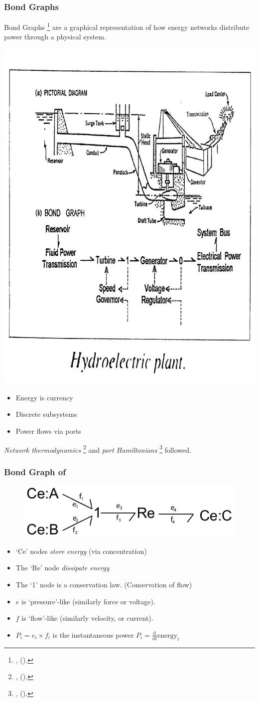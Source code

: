 \documentclass[11pt,reqno]{beamer}
\newcommand{\D}[2]{\frac{\mathrm{d} #1}{\mathrm{d} #2}}
\newcommand{\fcite}[1]{
\footnote{\tiny\cite{#1}, (\citeyear{#1}).}
}
\begin{document}
\begin{frame}
\frametitle{Bond Graphs}
Bond Graphs\fcite{Paynter2000} are a graphical representation of how energy networks distribute power through a physical system.

\begin{minipage}{0.45\linewidth}
\includegraphics[width=\linewidth, height=0.66\linewidth]{hydro.jpg}
\end{minipage}
\begin{minipage}{0.45\linewidth}
	
\begin{itemize}
	\item Energy is currency
	\item Discrete subsystems
	\item Power flows via ports
\end{itemize}
\end{minipage}

\emph{Network thermodynamics}\fcite{Oster1971} and \emph{port Hamiltonians}\fcite{VanderSchaft2014b} followed.  
\end{frame}
\begin{frame}
\frametitle{Bond Graph of }
\begin{figure}
	\includegraphics{bondgraph_abc_naive}
\end{figure}
\begin{itemize}
	\item `Ce' nodes \emph{store energy} (via concentration)
	\item The `Re' node \emph{dissipate energy}
	\item The `1' node is a conservation law. (Conservation of flow)
	\item $e$ is `pressure'-like (similarly force or voltage).
	\item $f$ is `flow'-like (similarly velocity, or current).
	\item $P_i = e_i\times f_i$ is the instantaneous power $P_i = \D{}{t}\text{energy}_i$ 
\end{itemize}
\end{frame}
\end{document}

